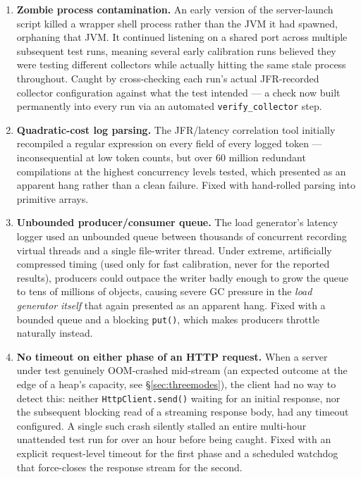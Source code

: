 \documentclass[11pt]{article}
\newcommand{\code}[1]{\texttt{#1}}
\begin{document}
\begin{enumerate}[leftmargin=1.5em]
  \item \textbf{Zombie process contamination.} An early version of the server-launch script
    killed a wrapper shell process rather than the JVM it had spawned, orphaning that JVM. It
    continued listening on a shared port across multiple subsequent test runs, meaning several
    early calibration runs believed they were testing different collectors while actually hitting
    the same stale process throughout. Caught by cross-checking each run's actual JFR-recorded
    collector configuration against what the test intended --- a check now built permanently into
    every run via an automated \code{verify\_collector} step.
  \item \textbf{Quadratic-cost log parsing.} The JFR/latency correlation tool initially
    recompiled a regular expression on every field of every logged token --- inconsequential at
    low token counts, but over 60 million redundant compilations at the highest concurrency
    levels tested, which presented as an apparent hang rather than a clean failure. Fixed with
    hand-rolled parsing into primitive arrays.
  \item \textbf{Unbounded producer/consumer queue.} The load generator's latency logger used an
    unbounded queue between thousands of concurrent recording virtual threads and a single
    file-writer thread. Under extreme, artificially compressed timing (used only for fast
    calibration, never for the reported results), producers could outpace the writer badly enough
    to grow the queue to tens of millions of objects, causing severe GC pressure in the
    \emph{load generator itself} that again presented as an apparent hang. Fixed with a bounded
    queue and a blocking \code{put()}, which makes producers throttle naturally instead.
  \item \textbf{No timeout on either phase of an HTTP request.} When a server under test
    genuinely OOM-crashed mid-stream (an expected outcome at the edge of a heap's capacity, see
    \S\ref{sec:threemodes}), the client had no way to detect this: neither
    \code{HttpClient.send()} waiting for an initial response, nor the subsequent blocking read of
    a streaming response body, had any timeout configured. A single such crash silently stalled
    an entire multi-hour unattended test run for over an hour before being caught. Fixed with an
    explicit request-level timeout for the first phase and a scheduled watchdog that force-closes
    the response stream for the second.

\end{enumerate}
\end{document}
